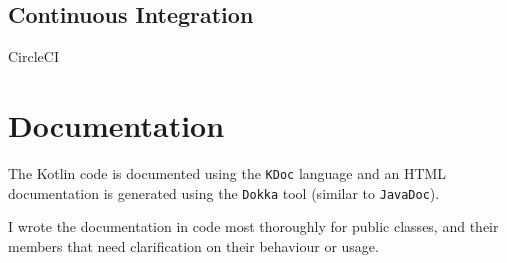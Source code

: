 \subsection{Continuous Integration}
CircleCI


\section{Documentation}

The Kotlin code is documented using the \texttt{KDoc} language and an HTML documentation is generated using the \texttt{Dokka} tool (similar to \texttt{JavaDoc}).\citeneeded

I wrote the documentation in code most thoroughly for public classes, and their members that need clarification on their behaviour or usage.



